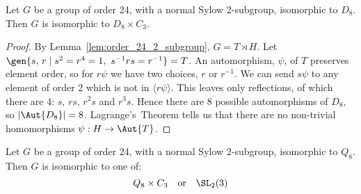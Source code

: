 \begin{lemma}
    Let \(G\) be a group of order 24, with a normal Sylow 2-subgroup, isomorphic to \(D_8\).
    Then \(G\) is isomorphic to \(D_8 \times C_3\).
\end{lemma}

\begin{proof}
    By Lemma~\ref{lem:order_24_2_subgroup}, \(G = T \rtimes H\).
    Let \(\gen{s,\,r \mid s^2 = r^4 = 1,\ s^{-1}rs = r^{-1}} = T\).
    An automorphism, \(\psi\), of \(T\) preserves element order, so for \(r\psi\) we have two choices, \(r\) or
    \(r^{-1}\).
    We can send \(s\psi\) to any element of order 2 which is not in \(\langle r\psi \rangle\).
    This leaves only reflections, of which there are 4: \(s,\,rs,\,r^2s\) and \(r^3s\).
    Hence there are 8 possible automorphisms of \(D_8\), so \(|\Aut{D_8}| = 8\).
    Lagrange's~Theorem tells us that there are no non-trivial homomorphisms \(\psi:H \to \Aut{T}\).
\end{proof}

\begin{lemma}\label{lem:24_last}
    Let \(G\) be a group of order 24, with a normal Sylow 2-subgroup, isomorphic to \(Q_8\).
    Then \(G\) is isomorphic to one of:
    \[
        Q_8 \times C_3 \quad \text{or} \quad%
        \SL_2(3)
    \]
\end{lemma}

